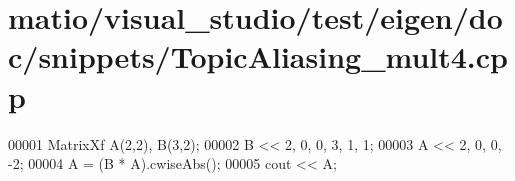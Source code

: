 \hypertarget{matio_2visual__studio_2test_2eigen_2doc_2snippets_2_topic_aliasing__mult4_8cpp_source}{}\section{matio/visual\+\_\+studio/test/eigen/doc/snippets/\+Topic\+Aliasing\+\_\+mult4.cpp}
\label{matio_2visual__studio_2test_2eigen_2doc_2snippets_2_topic_aliasing__mult4_8cpp_source}

\begin{DoxyCode}
00001 MatrixXf A(2,2), B(3,2);
00002 B << 2, 0,  0, 3, 1, 1;
00003 A << 2, 0, 0, -2;
00004 A = (B * A).cwiseAbs();
00005 cout << A;
\end{DoxyCode}
